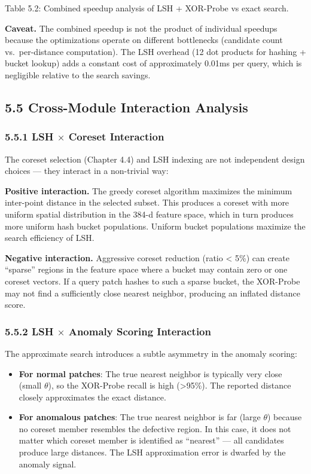\documentclass[12pt, a4paper, oneside]{report}
\begin{document}
Table 5.2: Combined speedup analysis of LSH + XOR-Probe vs exact search.

\textbf{Caveat.} The combined speedup is not the product of individual speedups because the optimizations operate on different bottlenecks (candidate count vs.~per-distance computation). The LSH overhead (12 dot products for hashing + bucket lookup) adds a constant cost of approximately 0.01ms per query, which is negligible relative to the search savings.

\bigskip\noindent\hrulefill\bigskip

\subsection{5.5 Cross-Module Interaction Analysis}\label{cross-module-interaction-analysis}

\subsubsection{5.5.1 LSH $\times$ Coreset Interaction}\label{lsh-coreset-interaction}

The coreset selection (Chapter 4.4) and LSH indexing are not independent design choices --- they interact in a non-trivial way:

\textbf{Positive interaction.} The greedy coreset algorithm maximizes the minimum inter-point distance in the selected subset. This produces a coreset with more uniform spatial distribution in the 384-d feature space, which in turn produces more uniform hash bucket populations. Uniform bucket populations maximize the search efficiency of LSH.

\textbf{Negative interaction.} Aggressive coreset reduction (ratio \textless{} 5\%) can create ``sparse'' regions in the feature space where a bucket may contain zero or one coreset vectors. If a query patch hashes to such a sparse bucket, the XOR-Probe may not find a sufficiently close nearest neighbor, producing an inflated distance score.

\subsubsection{5.5.2 LSH $\times$ Anomaly Scoring Interaction}\label{lsh-anomaly-scoring-interaction}

The approximate search introduces a subtle asymmetry in the anomaly scoring:

\begin{itemize}
\item
  \textbf{For normal patches}: The true nearest neighbor is typically very close (small \(\theta\)), so the XOR-Probe recall is high (\textgreater95\%). The reported distance closely approximates the exact distance.
\item
  \textbf{For anomalous patches}: The true nearest neighbor is far (large \(\theta\)) because no coreset member resembles the defective region. In this case, it does not matter which coreset member is identified as ``nearest'' --- all candidates produce large distances. The LSH approximation error is dwarfed by the anomaly signal.
\end{itemize}
\end{document}
